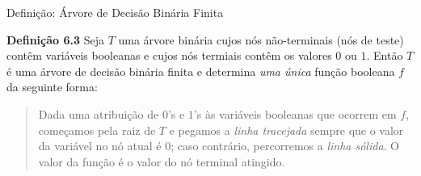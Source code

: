 \expandafter\documentclass\expandafter[table, usenames, svgnames, dvipsnames,14pt, \classopts]{beamer}
\begin{document}
\begin{frame}{Definição: Árvore de Decisão Binária Finita}

    \begin{block}{\textbf{Definição 6.3}}
        \small
        Seja $T$ uma árvore binária cujos nós não-terminais (nós de teste) contêm variáveis booleanas e cujos nós termiais contêm os valores $0$ ou $1$. Então $T$ é uma árvore de decisão binária finita e determina \textit{uma única} função booleana $f$ da seguinte forma:
        
        \begin{quotation}
        \noindent\justifying
        Dada uma atribuição de $0$'s e $1$'s às variáveis booleanas que ocorrem em $f$, começamos pela raiz de $T$ e pegamos a \textit{linha tracejada} sempre que o valor da variável no nó atual é $0$; caso contrário, percorremos a \textit{linha sólida}. O valor da função é o valor do nó terminal atingido.
        \end{quotation}
    \end{block}

\end{frame}
\end{document}
